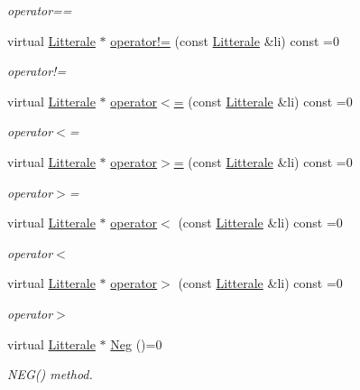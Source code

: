 \begin{DoxyCompactItemize}
\begin{DoxyCompactList}\small\item\em operator== \end{DoxyCompactList}\item 
virtual \hyperlink{class_litterale}{Litterale} $\ast$ \hyperlink{class_litterale_aec92913de9d127360897b0d644b5a44f}{operator!=} (const \hyperlink{class_litterale}{Litterale} \&li) const  =0
\begin{DoxyCompactList}\small\item\em operator!= \end{DoxyCompactList}\item 
virtual \hyperlink{class_litterale}{Litterale} $\ast$ \hyperlink{class_litterale_af70f373b306808959e234a366de8d799}{operator$<$=} (const \hyperlink{class_litterale}{Litterale} \&li) const  =0
\begin{DoxyCompactList}\small\item\em operator$<$= \end{DoxyCompactList}\item 
virtual \hyperlink{class_litterale}{Litterale} $\ast$ \hyperlink{class_litterale_af31c8ca0ecaccbc05718193d8858bc5d}{operator$>$=} (const \hyperlink{class_litterale}{Litterale} \&li) const  =0
\begin{DoxyCompactList}\small\item\em operator$>$= \end{DoxyCompactList}\item 
virtual \hyperlink{class_litterale}{Litterale} $\ast$ \hyperlink{class_litterale_a43ba11f1f3ee6cbf21cd2432708938f9}{operator$<$} (const \hyperlink{class_litterale}{Litterale} \&li) const  =0
\begin{DoxyCompactList}\small\item\em operator$<$ \end{DoxyCompactList}\item 
virtual \hyperlink{class_litterale}{Litterale} $\ast$ \hyperlink{class_litterale_a743719ab28de43c55449a90ccd55a95a}{operator$>$} (const \hyperlink{class_litterale}{Litterale} \&li) const  =0
\begin{DoxyCompactList}\small\item\em operator$>$ \end{DoxyCompactList}\item 
virtual \hyperlink{class_litterale}{Litterale} $\ast$ \hyperlink{class_litterale_ac9261e971a9d7d84137557d1cad94336}{Neg} ()=0
\begin{DoxyCompactList}\small\item\em N\+E\+G() method. \end{DoxyCompactList}\item 

\end{DoxyCompactItemize}
